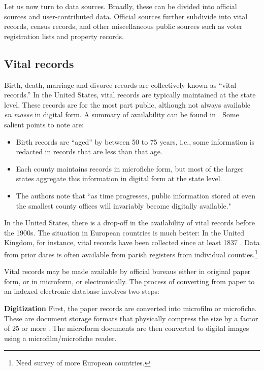 \documentclass{article}
\begin{document}
Let us now turn to data sources. Broadly, these can be divided into official sources and user-contributed data. Official sources further subdivide into vital records, census records, and other miscellaneous public sources such as voter registration lists and property records.

\subsection{Vital records}

Birth, death, marriage  and divorce records are collectively known as ``vital records.'' In the United States, vital records are typically maintained at the state level. These records are for the most part public, although not always available {\em en masse} in digital form. A summary of availability can be found in \cite{messing}. Some salient points to note are:
\begin{itemize}
\item
Birth records are ``aged'' by between 50 to 75 years, i.e., some information is redacted in records that are less than that age.
\item
Each county maintains records in microfiche form, but most of the larger states aggregate this information in digital form at the state level. 
\item
The authors note that ``as time progresses, public information stored at even the smallest county offices will invariably become digitally available."
\end{itemize}

In the United States, there is a drop-off in the availability of vital records before the 1900s. The situation in European countries is much better: In the United Kingdom, for instance, vital records have been collected since at least 1837 \cite{ukbmd.org.uk}. Data from prior dates is often available from parish registers from individual counties.\footnote{Need survey of more European countries.} 

Vital records may be made available by official bureaus either in original paper form, or in microform, or electronically. The process of converting from paper to an indexed electronic database involves two steps:

{\bf Digitization} First, the paper records are converted into microfilm or microfiche. These are document storage formats that physically compress the size by a factor of 25 or more \cite{wp-microform}. The microform documents are then converted to digital images using a microfilm/microfiche reader. 
\end{document}
